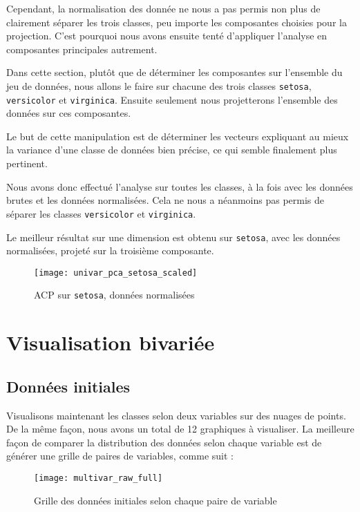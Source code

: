 \documentclass[french]{report}
\begin{document}
    
    Cependant, la normalisation des donnée ne nous a pas permis non plus de clairement séparer les trois classes, peu importe les composantes choisies pour la projection.
    C'est pourquoi nous avons ensuite tenté d'appliquer l'analyse en composantes principales autrement.
    
    
    Dans cette section, plutôt que de déterminer les composantes sur l'ensemble du jeu de données, nous allons le faire sur chacune des trois classes \texttt{setosa}, \texttt{versicolor} et \texttt{virginica}.
    Ensuite seulement nous projetterons l'ensemble des données sur ces composantes.
    
    Le but de cette manipulation est de déterminer les vecteurs expliquant au mieux la variance d'une classe de données bien précise, ce qui semble finalement plus pertinent.
    
    Nous avons donc effectué l'analyse sur toutes les classes, à la fois avec les données brutes et les données normalisées.
    Cela ne nous a néanmoins pas permis de séparer les classes \texttt{versicolor} et \texttt{virginica}.
    
    Le meilleur résultat sur une dimension est obtenu sur \texttt{setosa}, avec les données normalisées, projeté sur la troisième composante.
    
    \begin{figure}[h]
        \centering
        \texttt{[image: univar\_pca\_setosa\_scaled]}
        \caption{ACP sur \texttt{setosa}, données normalisées}
    \end{figure}
    
    
    \chapter{Visualisation bivariée}
    
    \section{Données initiales}
    
    Visualisons maintenant les classes selon deux variables sur des nuages de points.
    De la même façon, nous avons un total de 12 graphiques à visualiser.
    La meilleure façon de comparer la distribution des données selon chaque variable est de générer une grille de paires de variables, comme suit :
    
    \begin{figure}[h]
        \centering
        \texttt{[image: multivar\_raw\_full]}
        \caption{Grille des données initiales selon chaque paire de variable}
    \end{figure}
    
\end{document}
